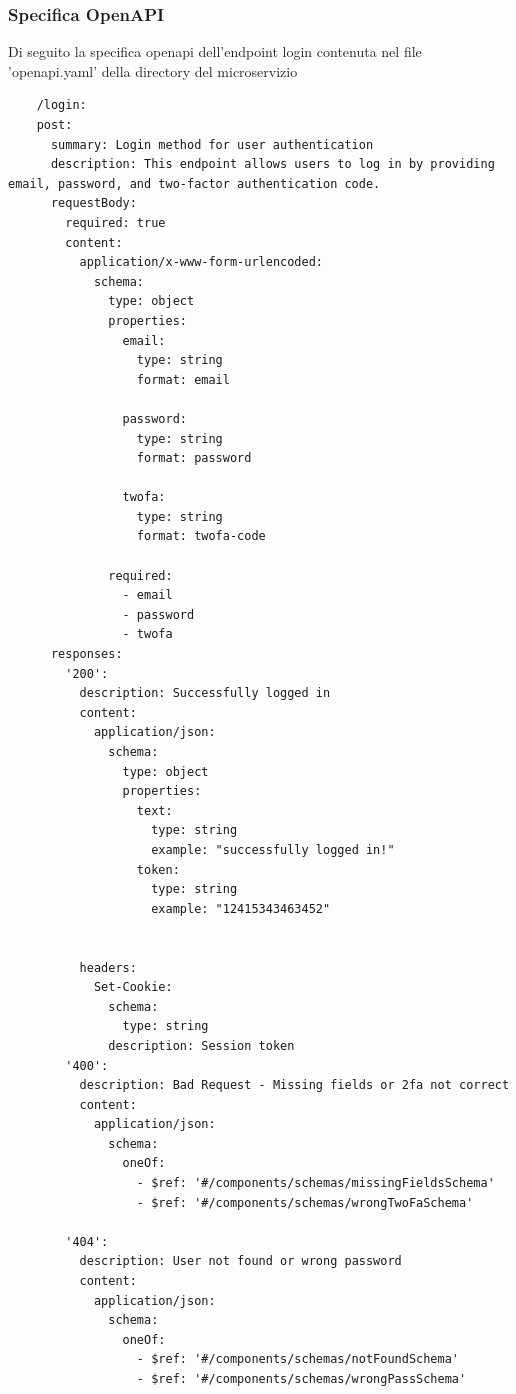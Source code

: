 \documentclass{report}
\begin{document}
\subsubsection*{Specifica OpenAPI}
Di seguito la specifica openapi dell'endpoint login contenuta nel file 'openapi.yaml' della directory del microservizio
\begin{verbatim}
	/login:
    post:
      summary: Login method for user authentication
      description: This endpoint allows users to log in by providing email, password, and two-factor authentication code.
      requestBody:
        required: true
        content:
          application/x-www-form-urlencoded:
            schema:
              type: object
              properties:
                email:
                  type: string
                  format: email

                password:
                  type: string
                  format: password
                  
                twofa:
                  type: string
                  format: twofa-code
               
              required:
                - email
                - password
                - twofa
      responses:
        '200':
          description: Successfully logged in
          content:
            application/json:
              schema:
                type: object
                properties:
                  text:
                    type: string
                    example: "successfully logged in!"
                  token:
                    type: string
                    example: "12415343463452"
            

          headers:
            Set-Cookie:
              schema:
                type: string
              description: Session token
        '400':
          description: Bad Request - Missing fields or 2fa not correct
          content:
            application/json:
              schema:
                oneOf:
                  - $ref: '#/components/schemas/missingFieldsSchema'
                  - $ref: '#/components/schemas/wrongTwoFaSchema'
      
        '404':
          description: User not found or wrong password
          content:
            application/json:
              schema:
                oneOf:
                  - $ref: '#/components/schemas/notFoundSchema'
                  - $ref: '#/components/schemas/wrongPassSchema'
\end{verbatim}
\end{document}
